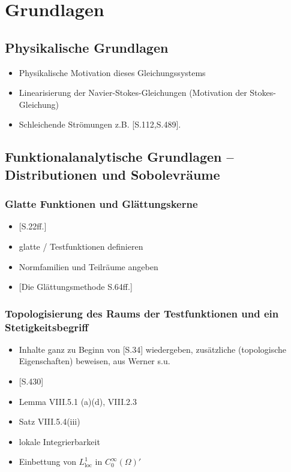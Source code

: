 \chapter{Grundlagen}
\label{cp:grundlagen}

\section{Physikalische Grundlagen}

\begin{itemize}
  \item Physikalische Motivation dieses Gleichungssystems
  \item Linearisierung der Navier-Stokes-Gleichungen (Motivation der Stokes-Gleichung)
  \item Schleichende Strömungen z.B. \cite{spurk10stroemungslehre}[S.112,S.489]. 
\end{itemize}

\section{Funktionalanalytische Grundlagen -- Distributionen und Sobolevräume}

\subsection{Glatte Funktionen und Glättungskerne}
\label{subsec:smoothMolly}

\begin{itemize}
  \item \cite{sohr2001navier}[S.22ff.]
  \item glatte / Testfunktionen definieren
  \item Normfamilien und Teilräume angeben
  \item \cite{sohr2001navier}[Die Glättungsmethode S.64ff.]
\end{itemize}

\subsection{Topologisierung des Raums der Testfunktionen und ein Stetigkeitsbegriff}

\begin{itemize}
  \item Inhalte ganz zu Beginn von \cite{sohr2001navier}[S.34] wiedergeben, zusätzliche (topologische Eigenschaften) beweisen, aus Werner s.u.
  \item \cite{werner2011fa}[S.430]
  \item Lemma VIII.5.1 (a)(d), VIII.2.3
  \item Satz VIII.5.4(iii)
  \item lokale Integrierbarkeit
  \item Einbettung von $L^1_{\mathrm{loc}}$ in $C_0^\infty(\Omega)'$
\end{itemize}

